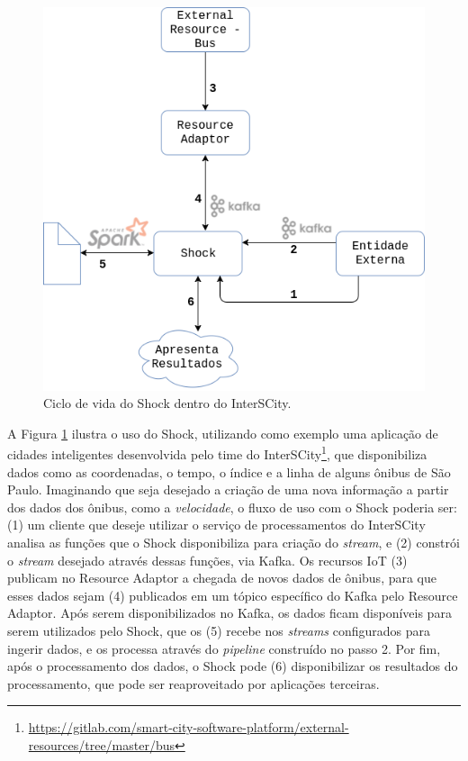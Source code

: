\pagebreak

\begin{figure}[hbt]
  \centering
    \includegraphics[scale=0.45]{figuras/shock.png}
    \caption{Ciclo de vida do Shock dentro do InterSCity.}
  \label{fig:shock}
\end{figure}

A Figura \ref{fig:shock} ilustra o uso do Shock, utilizando como exemplo uma
aplicação de cidades inteligentes desenvolvida pelo time do
InterSCity\footnote{\url{https://gitlab.com/smart-city-software-platform/external-resources/tree/master/bus}},
que disponibiliza dados como as coordenadas, o tempo, o índice e a linha de
alguns ônibus de São Paulo. Imaginando que seja desejado a criação de uma nova
informação a partir dos dados dos ônibus, como a \textit{velocidade}, o fluxo
de uso com o Shock poderia ser: (1) um cliente que deseje utilizar o serviço
de processamentos do InterSCity analisa as funções que o Shock disponibiliza
para criação do \textit{stream}, e (2) constrói o \textit{stream} desejado através
dessas funções, via Kafka. Os recursos IoT (3) publicam no Resource Adaptor a
chegada de novos dados de ônibus, para que esses dados sejam (4) publicados em
um tópico específico do Kafka pelo Resource Adaptor. Após serem disponibilizados
no Kafka, os dados ficam disponíveis para serem utilizados pelo Shock, que os (5)
recebe nos \textit{streams} configurados para ingerir dados, e os processa
através do \textit{pipeline} construído no passo 2. Por fim, após o
processamento dos dados, o Shock pode (6) disponibilizar os resultados do
processamento, que pode ser reaproveitado por aplicações terceiras.


